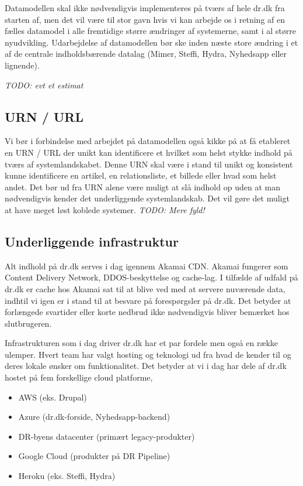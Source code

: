 \documentclass{article}
\begin{document}
Datamodellen skal ikke nødvendigvis implementeres på tværs af hele dr.dk fra starten af, men det vil være til stor gavn hvis vi kan arbejde os i retning af en fælles datamodel i alle fremtidige større ændringer af systemerne,
samt i al større nyudvikling.
Udarbejdelse af datamodellen bør ske inden næste store ændring i et af de centrale indholdsbærende datalag (Mimer, Steffi, Hydra, Nyhedsapp eller lignende).

    \textit{TODO: evt et estimat}


\subsection{URN / URL}
Vi bør i forbindelse med arbejdet på datamodellen også kikke på at få etableret en URN / URL der unikt kan identificere et hvilket som helst stykke indhold på tværs af systemlandskabet. Denne URN skal være i stand til unikt og konsistent kunne identificere en artikel, en relationsliste, et billede eller hvad som helst andet. Det bør ud fra URN alene være muligt at slå indhold op uden at man nødvendigvis kender det underliggende systemlandskab. Det vil gøre det muligt at have meget løst koblede systemer.
    \textit{TODO: Mere fyld!}

\subsection{Underliggende infrastruktur}
Alt indhold på dr.dk serves i dag igennem Akamai CDN. Akamai fungerer som Content Delivery Network, DDOS-beskyttelse og cache-lag. I tilfælde af udfald på dr.dk er cache hos Akamai sat
til at blive ved med at servere nuværende data, indhtil vi igen er i stand til at besvare på forespørgsler på dr.dk. Det betyder at forlængede svartider eller korte nedbrud ikke nødvendigvis bliver bemærket hos slutbrugeren.

Infrastrukturen som i dag driver dr.dk har et par fordele men også en række ulemper. Hvert team har valgt hosting og teknologi ud fra hvad de kender til og deres lokale ønsker om funktionalitet. Det betyder at vi i dag har dele af dr.dk hostet på fem forskellige cloud platforme,

\begin{itemize}
    \item AWS (eks. Drupal)
    \item Azure (dr.dk-forside, Nyhedsapp-backend)
    \item DR-byens datacenter (primært legacy-produkter)
    \item Google Cloud (produkter på DR Pipeline)
    \item Heroku (eks. Steffi, Hydra)
\end{itemize}
\end{document}
